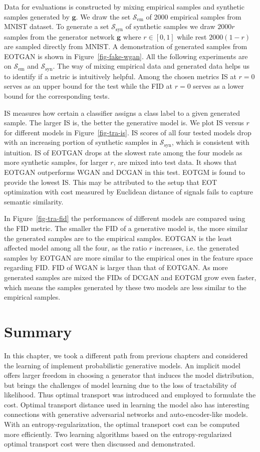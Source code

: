 Data for evaluations is constructed by mixing empirical samples and
synthetic samples generated by $\bm{g}$. We draw the set $\mathcal{S}_{\mathrm{em}}$ of 2000 empirical samples from MNIST dataset. To generate a set $\mathcal{S}_{\mathrm{syn}}$ of synthetic
samples we draw $2000r$ samples from the generator network $\bm{g}$ where
$r\in[0,1]$ while rest $2000(1-r)$ are sampled directly from
MNIST. A demonstration of generated samples from EOTGAN is shown in Figure~\ref{fig-fake-wgan}.
All the following experiments are on
$\mathcal{S}_{\mathrm{em}}$ and $\mathcal{S}_{\mathrm{syn}}$. 
The way of mixing empirical data and generated data helps
us to identify if a metric is intuitively helpful. Among the chosen metrics IS at $r=0$ serves as an upper bound for the test while the FID at $r=0$ serves as a lower bound for the corresponding tests. 

IS measures how certain a classifier assigns a class label to a given
generated sample. The larger IS is, the better the generative model
is. We plot IS versus $r$ for different models in
Figure~\ref{fig-tra-is}. IS scores of all four tested models drop with
an increasing portion of synthetic samples in
$\mathcal{S}_{\mathrm{syn}}$, which is consistent with intuition. IS
of EOTGAN drops at the slowest rate among the four models as more
synthetic samples, for larger $r$, are mixed into test data. It shows
that EOTGAN outperforms WGAN and DCGAN in this test. EOTGM is found to provide the lowest IS.
This may be attributed to the setup that 
EOT optimization with cost measured by Euclidean distance of signals
fails to capture semantic similarity.

In Figure~\ref{fig-tra-fid} the performances of different models are
compared using the FID metric. The smaller the FID of a generative model is, the more similar the
generated samples are to the empirical samples. EOTGAN is the least affected model among all the four, as the ratio $r$ increases, i.e. the generated samples by EOTGAN are more similar to the empirical
ones in the feature space regarding FID. FID of WGAN is larger than that of EOTGAN. As
more generated samples are mixed the FIDs of DCGAN and EOTGM grow
even faster, which means the samples generated by these two models are
less similar to the empirical samples.

\section{Summary}
In this chapter, we took a different path from previous chapters and considered the learning of implement probabilistic generative models. An implicit model offers larger freedom in choosing a generator that induces the model distribution, but brings the challenges of model learning due to the loss of tractability of likelihood. Thus optimal transport was introduced and employed to formulate the cost. Optimal transport distance used in learning the model also has interesting connections with generative adversarial networks and auto-encoder-like models. With an entropy-regularization, the optimal transport cost can be computed more efficiently. Two learning algorithms based on the entropy-regularized optimal transport cost were then discussed and demonstrated. 

